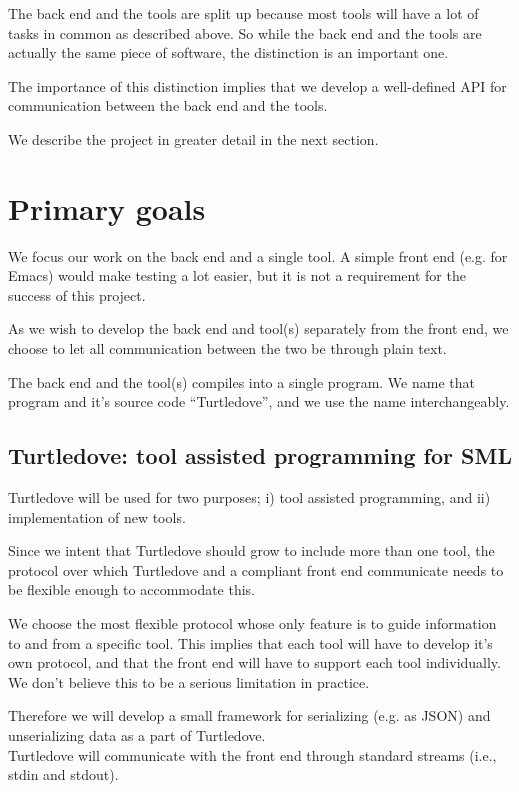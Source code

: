 \documentclass[a4paper,oneside]{article}
\begin{document}
The back end and the tools are split up because most tools will have a lot of tasks in common as
described above.  So while the back end and the tools are actually the same piece of software, the
distinction is an important one.

The importance of this distinction implies that we develop a well-defined API for communication
between the back end and the tools.

We describe the project in greater detail in the next section.

\section{Primary goals}
We focus our work on the back end and a single tool. A simple front end (e.g. for Emacs) would make
testing a lot easier, but it is not a requirement for the success of this project.

As we wish to develop the back end and tool(s) separately from the front end, we choose to let all
communication between the two be through plain text.

The back end and the tool(s) compiles into a single program. We name that program and it's source
code ``Turtledove'', and we use the name interchangeably.

\subsection{Turtledove: tool assisted programming for SML} 
Turtledove will be used for two purposes; i) tool assisted programming, and ii) implementation of
new tools.

Since we intent that Turtledove should grow to include more than one tool, the protocol over which
Turtledove and a compliant front end communicate needs to be flexible enough to accommodate this.

We choose the most flexible protocol whose only feature is to guide information to and from a
specific tool. This implies that each tool will have to develop it's own protocol, and that the
front end will have to support each tool individually. We don't believe this to be a serious
limitation in practice.

Therefore we will develop a small framework for serializing (e.g. as JSON) and unserializing data as
a part of Turtledove.
\\

Turtledove will communicate with the front end through standard streams (i.e., stdin and stdout).
\\
\end{document}
